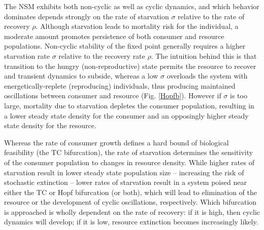 \documentclass{pnastwo}
\begin{document}
\begin{article}
The NSM exhibits both non-cyclic as well as cyclic dynamics, and which behavior dominates depends strongly on the rate of starvation $\sigma$ relative to the rate of recovery $\rho$.
Although starvation leads to mortality risk for the individual, a moderate amount promotes persistence of both consumer and resource populations.
Non-cyclic stability of the fixed point generally requires a higher starvation rate $\sigma$ relative to the recovery rate $\rho$.
The intuition behind this is that transition to the hungry (non-reproductive) state permits the resource to recover and transient dynamics to subside, whereas a low $\sigma$ overloads the system with energetically-replete (reproducing) individuals, thus producing maintained oscillations between consumer and resource (Fig. \ref{Hopfb}).
However if $\sigma$ is too large, mortality due to starvation depletes the consumer population, resulting in a lower steady state density for the consumer and an opposingly higher steady state density for the resource.

Whereas the rate of consumer growth defines a hard bound of biological feasibility (the TC bifurcation), the rate of starvation determines the sensitivity of the consumer population to changes in resource density.
While higher rates of starvation result in lower steady state population size -- increasing the risk of stochastic extinction -- lower rates of starvation result in a system poised near either the TC or Hopf bifurcation (or both), which will lead to elimination of the resource or the development of cyclic oscillations, respectively.
Which bifurcation is approached is wholly dependent on the rate of recovery: if it is high, then cyclic dynamics will develop; if it is low, resource extinction becomes increasingly likely.



\end{article}
\end{document}

